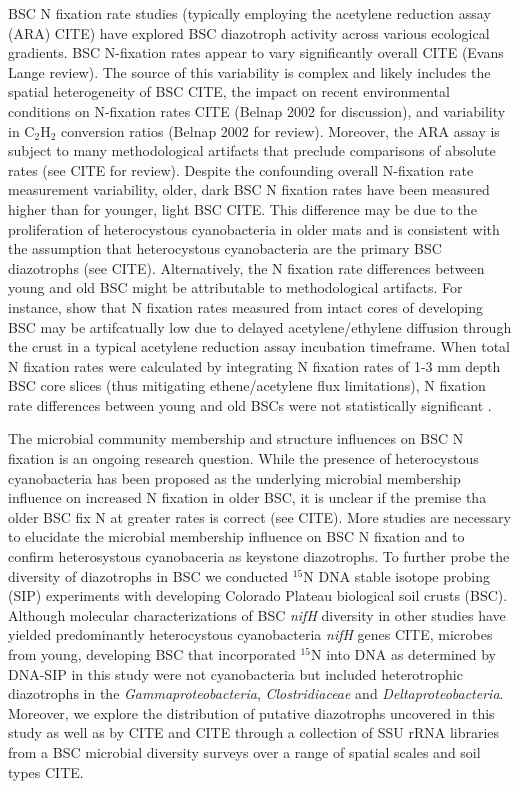 BSC N fixation rate studies (typically employing the acetylene reduction assay (ARA) CITE) have explored BSC diazotroph activity across various ecological gradients. BSC N-fixation rates appear to vary significantly overall CITE (Evans Lange review). The source of this variability is complex and likely includes the spatial heterogeneity of BSC CITE, the impact on recent environmental conditions on N-fixation rates CITE (Belnap 2002 for discussion), and variability in C$_{2}$H$_{2}$ conversion ratios (Belnap 2002 for review). Moreover, the ARA assay is subject to many methodological artifacts that preclude comparisons of absolute rates (see CITE for review). Despite the confounding overall N-fixation rate measurement variability, older, dark BSC N fixation rates have been measured higher than for younger, light BSC CITE. This difference may be due to the proliferation of heterocystous cyanobacteria in older mats and is consistent with the assumption that heterocystous cyanobacteria are the primary BSC diazotrophs (see CITE). Alternatively, the N fixation rate differences between young and old BSC might be attributable to methodological artifacts. For instance, \citet{15643930} show that N fixation rates measured from intact cores of developing BSC may be artifcatually low due to delayed acetylene/ethylene diffusion through the crust in a typical acetylene reduction assay incubation timeframe. When total N fixation rates were calculated by integrating N fixation rates of 1-3 mm depth BSC core slices (thus mitigating ethene/acetylene flux limitations), N fixation rate differences between young and old BSCs were not statistically significant \cite{15643930}.

The microbial community membership and structure influences on BSC N fixation is an ongoing research question. While the presence of heterocystous cyanobacteria has been proposed as the underlying microbial membership influence on increased N fixation in older BSC, it is unclear if the premise tha older BSC fix N at greater rates is correct (see CITE). More studies are necessary to elucidate the microbial membership influence on BSC N fixation and to confirm heterosystous cyanobaceria as keystone diazotrophs. To further probe the diversity of diazotrophs in BSC we conducted $^{15}$N DNA stable isotope probing (SIP) experiments with developing Colorado Plateau biological soil crusts (BSC). Although molecular characterizations of BSC \textit{nifH} diversity in other studies have yielded predominantly heterocystous cyanobacteria \textit{nifH} genes CITE, microbes from young, developing BSC that incorporated $^{15}$N into DNA as determined by DNA-SIP in this study were not cyanobacteria but included heterotrophic diazotrophs in the \textit{Gammaproteobacteria}, \textit{Clostridiaceae} and \textit{Deltaproteobacteria}. Moreover, we explore the distribution of putative diazotrophs uncovered in this study as well as by CITE and CITE through a collection of SSU rRNA libraries from a BSC microbial diversity surveys over a range of spatial scales and soil types CITE.  